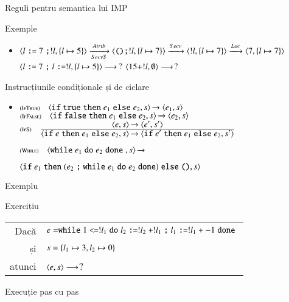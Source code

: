\documentclass[xcolor=pdftex,romanian,colorlinks]{beamer}
\begin{document}
\begin{section}{Reguli pentru semantica lui IMP}
\begin{frame}{Exemple}
\begin{itemize}
\item${\langle{l\ensuremath\mathrel{\text{\ttfamily :=}}7 \ensuremath\mathrel{\text{\ttfamily ;}} !l, \{l\mapsto 5\}}\rangle} \xrightarrow[SecvS]{Atrib}  {\langle{\ensuremath\mathrel{\text{\ttfamily ()}}\ensuremath\mathrel{\text{\ttfamily ;}} !l, \{l\mapsto 7\}}\rangle} \xrightarrow{Secv} {\langle{!l, \{l\mapsto 7\}}\rangle}  \xrightarrow{Loc} {\langle{7, \{l\mapsto 7\}}\rangle} $
\vitem ${\langle{l\ensuremath\mathrel{\text{\ttfamily :=}}7 \ensuremath\mathrel{\text{\ttfamily ;}} l \ensuremath\mathrel{\text{\ttfamily :=}} !l, \{l\mapsto 5\}}\rangle} \longrightarrow $?
\vitem ${\langle{15 + !l, \emptyset}\rangle} \longrightarrow $?
\end{itemize}
\end{frame}

\begin{frame}{Instrucțiunile condiționale și de ciclare}
\begin{itemize}
\item[]
$\reg[IfTrue]{\Ss{\c{\Sif  {\terminal{true}} \Sthen e_1 \Selse e_2,\stare}}{\c{e_1,\stare}}}{}{}$ 
\vitem[]
$\reg[IfFalse]{\Ss{\c{\Sif {\terminal{false}} \Sthen e_1 \Selse e_2,\stare}}{\c{e_2,\stare}}}{}{}$ 
\vitem[] 
$\reg[IfS]{
 \Ss{\c{\Sif {e} \Sthen e_1 \Selse e_2,\stare}}{\c{\Sif  {e'} \Sthen e_1 \Selse e_2,\stare'}}
}{
  \Ss{\c{e,\stare}}{\c{e',\stare'}}
}
{}$

\vitem[]$\reg[While]{\Ss{\c{\Swhile {e_1} \Sdo e_2 \Sdone{},\stare}}{}}{}
{}$

\hfill ${\langle{\ensuremath\mathrel{\text{\ttfamily if}}{e_1} \ensuremath\mathrel{\text{\ttfamily then}}(e_2\ensuremath\mathrel{\text{\ttfamily ;}} {\ensuremath\mathrel{\text{\ttfamily while}}{e_1} \ensuremath\mathrel{\text{\ttfamily do}}e_2 \ensuremath\mathrel{\text{\ttfamily done}}}) \ensuremath\mathrel{\text{\ttfamily else}}{\ensuremath\mathrel{\text{\ttfamily ()}}},s}\rangle}$
\end{itemize}
\end{frame}

\begin{frame}{Exemplu}
\begin{block}{Exercițiu}
\begin{tabular}{rl}
Dacă & $e =  \mathrel{\text{\ttfamily while}} 1 \mathrel{\text{\ttfamily <=}} !l_1  \mathrel{\text{\ttfamily do}} 
   {l_2 \mathrel{\text{\ttfamily :=}} !l_2 \mathrel{\text{\ttfamily +}} !l_1} \mathrel{\text{\ttfamily ;}}
   {l_1 \mathrel{\text{\ttfamily :=}} !l_1 \mathrel{\text{\ttfamily +}} -1} \mathrel{\text{\ttfamily done}}{}
   $ 
\\ 
și &
$s = \{l_1\mapsto 3, l_2\mapsto 0\}$\\
atunci & ${\langle{e, s}\rangle}\longrightarrow $?
\end{tabular}
\end{block}
\end{frame}

\begin{frame}
{Execuție pas cu pas}


\end{frame}
\end{section}
\end{document}
